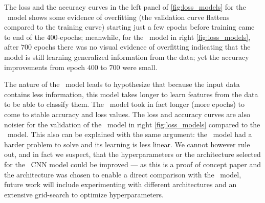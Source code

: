 The loss and the accuracy curves in the left panel of \autoref{fig:loss_models} for the \diabased\  model shows some evidence of overfitting (the validation curve flattens compared to the training curve) starting just a few epochs before training came to end of the 400-epochs; meanwhile, for the \nodia\ model in right \autoref{fig:loss_models}, after $700$ epochs there was no visual evidence of overfitting indicating that the model is still learning generalized information from the data; yet the accuracy improvements from epoch $400$ to $700$ were small.

The nature of the \nodia\ model leads to hypothesize that because the input data contains less information, this model takes longer to learn features from the data to be able to classify them. The \nodia\ model took in fact longer (more epochs) to come to stable accuracy and loss values. The loss and accuracy curves are also noisier for the validation of the \nodia\ model in right \autoref{fig:loss_models} compared to the \diabased\ model. This also can be explained with the same argument: the \nodia\ model had a harder problem to solve and its learning is less linear. We cannot however rule out, and in fact we suspect, that the hyperparameters or the architecture selected for the \nodia\ CNN model could be improved --- as this is a proof of concept paper and the architecture was chosen to enable a direct comparison with the \diabased\ model, future work will include experimenting with different architectures and an extensive grid-search to optimize hyperparameters.
